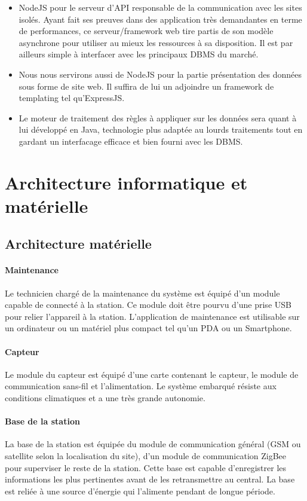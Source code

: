 \begin{itemize}
\item NodeJS pour le serveur d'API responsable de la communication avec les sites isolés. Ayant fait ses preuves dans des application très demandantes en terme de performances, ce serveur/framework web tire partis de son modèle asynchrone pour utiliser au mieux les ressources à sa disposition. Il est par ailleurs simple à interfacer avec les principaux DBMS du marché.
\item Nous nous servirons aussi de NodeJS pour la partie présentation des données sous forme de site web. Il suffira de lui un adjoindre un framework de templating tel qu'ExpressJS.
\item Le moteur de traitement des règles à appliquer sur les données sera quant à lui développé en Java, technologie plus adaptée au lourds traitements tout en gardant un interfacage efficace et bien fourni avec les DBMS.
\end{itemize}

\section{Architecture informatique et matérielle}

\subsection{Architecture matérielle}

\paragraph{Maintenance} Le technicien chargé de la maintenance du système est équipé d’un module capable de connecté à la station. Ce module doit être pourvu d’une prise USB pour relier l’appareil à la station. L’application de maintenance est utilisable sur un ordinateur  ou un matériel plus compact tel qu’un PDA ou un Smartphone. 

\paragraph{Capteur} Le module du capteur est équipé d’une carte contenant le capteur, le module de communication sans-fil et l’alimentation. Le système embarqué résiste aux conditions climatiques et a une très grande autonomie.

\paragraph{Base de la station} La base de la station est équipée du module de communication général  (GSM ou satellite selon la localisation du site), d’un module de communication ZigBee pour superviser le reste de la station. Cette base est capable d’enregistrer les informations les plus pertinentes avant de les retransmettre au central. La base est reliée à une source d’énergie qui l’alimente pendant de longue période. 

